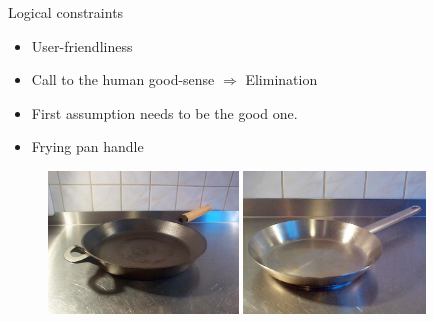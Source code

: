 \documentclass{beamer}
\begin{document}
\begin{frame}{Logical constraints}
    \begin{itemize}
    		\item User-friendliness
    		\item Call to the human good-sense $\Rightarrow$ Elimination
    		\item First assumption  needs to be the good one.
    		\item Frying pan handle
    \end{itemize}

        \begin{figure}[h]
        \centering
        \includegraphics[width=0.45\textwidth]{frying-pan-2handles.jpg}
        \includegraphics[width=0.43\textwidth]{frying-pan-1handle.jpg}
        \end{figure}
\end{frame}
\end{document}
